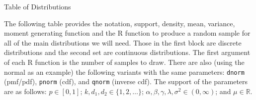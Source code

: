 \documentclass[10pt]{article}
\begin{document}
\noindent
{\LARGE Table of Distributions}

\vspace*{18pt}

\noindent
The following table provides the notation, support,
density, mean, variance, moment generating function 
and the R function to produce a random sample for all
of the main distributions we will need. Those in the
first block are discrete distributions and the second
set are continuous distributions. The first argument
of each R function is the number of samples to draw.
There are also (using the normal as an example) the
following variants  with the same parameters:
\texttt{dnorm} (pmf/pdf), \texttt{pnorm} (cdf), and
\texttt{qnorm} (inverse cdf). The support of the 
parameters are as follows: $p \in [0, 1]$;
$k, d_1, d_2 \in \{1, 2, \ldots \}$;
$\alpha, \beta, \gamma, \lambda, \sigma^2 \in (0, \infty)$;
and $\mu \in \mathbb{R}$.

\vspace*{0pt}
\end{document}
